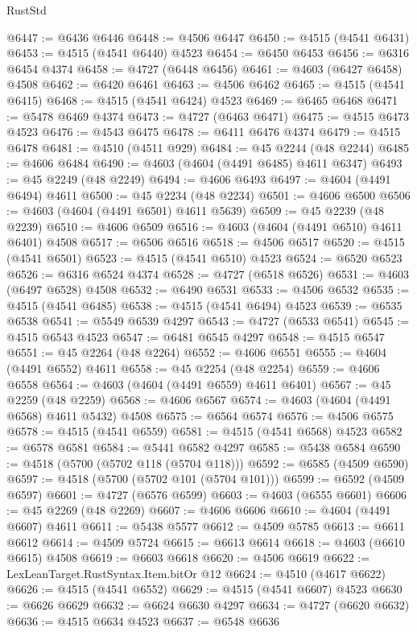 \begin{lexlean}{RustStd}
\begin{coremodule}
@6447 := @6436 @6446
@6448 := @4506 @6447
@6450 := @4515 (@4541 @6431)
@6453 := @4515 (@4541 @6440) @4523
@6454 := @6450 @6453
@6456 := @6316 @6454 @4374
@6458 := @4727 (@6448 @6456)
@6461 := @4603 (@6427 @6458) @4508
@6462 := @6420 @6461
@6463 := @4506 @6462
@6465 := @4515 (@4541 @6415)
@6468 := @4515 (@4541 @6424) @4523
@6469 := @6465 @6468
@6471 := @5478 @6469 @4374
@6473 := @4727 (@6463 @6471)
@6475 := @4515 @6473 @4523
@6476 := @4543 @6475
@6478 := @6411 @6476 @4374
@6479 := @4515 @6478
@6481 := @4510 (@4511 @929)
@6484 := @45 @2244 (@48 @2244)
@6485 := @4606 @6484
@6490 := @4603 (@4604 (@4491 @6485) @4611 @6347)
@6493 := @45 @2249 (@48 @2249)
@6494 := @4606 @6493
@6497 := @4604 (@4491 @6494) @4611
@6500 := @45 @2234 (@48 @2234)
@6501 := @4606 @6500
@6506 := @4603 (@4604 (@4491 @6501) @4611 @5639)
@6509 := @45 @2239 (@48 @2239)
@6510 := @4606 @6509
@6516 := @4603 (@4604 (@4491 @6510) @4611 @6401) @4508
@6517 := @6506 @6516
@6518 := @4506 @6517
@6520 := @4515 (@4541 @6501)
@6523 := @4515 (@4541 @6510) @4523
@6524 := @6520 @6523
@6526 := @6316 @6524 @4374
@6528 := @4727 (@6518 @6526)
@6531 := @4603 (@6497 @6528) @4508
@6532 := @6490 @6531
@6533 := @4506 @6532
@6535 := @4515 (@4541 @6485)
@6538 := @4515 (@4541 @6494) @4523
@6539 := @6535 @6538
@6541 := @5549 @6539 @4297
@6543 := @4727 (@6533 @6541)
@6545 := @4515 @6543 @4523
@6547 := @6481 @6545 @4297
@6548 := @4515 @6547
@6551 := @45 @2264 (@48 @2264)
@6552 := @4606 @6551
@6555 := @4604 (@4491 @6552) @4611
@6558 := @45 @2254 (@48 @2254)
@6559 := @4606 @6558
@6564 := @4603 (@4604 (@4491 @6559) @4611 @6401)
@6567 := @45 @2259 (@48 @2259)
@6568 := @4606 @6567
@6574 := @4603 (@4604 (@4491 @6568) @4611 @5432) @4508
@6575 := @6564 @6574
@6576 := @4506 @6575
@6578 := @4515 (@4541 @6559)
@6581 := @4515 (@4541 @6568) @4523
@6582 := @6578 @6581
@6584 := @5441 @6582 @4297
@6585 := @5438 @6584
@6590 := @4518 (@5700 (@5702 @118 (@5704 @118)))
@6592 := @6585 (@4509 @6590)
@6597 := @4518 (@5700 (@5702 @101 (@5704 @101)))
@6599 := @6592 (@4509 @6597)
@6601 := @4727 (@6576 @6599)
@6603 := @4603 (@6555 @6601)
@6606 := @45 @2269 (@48 @2269)
@6607 := @4606 @6606
@6610 := @4604 (@4491 @6607) @4611
@6611 := @5438 @5577
@6612 := @4509 @5785
@6613 := @6611 @6612
@6614 := @4509 @5724
@6615 := @6613 @6614
@6618 := @4603 (@6610 @6615) @4508
@6619 := @6603 @6618
@6620 := @4506 @6619
@6622 := LexLeanTarget.RustSyntax.Item.bitOr @12
@6624 := @4510 (@4617 @6622)
@6626 := @4515 (@4541 @6552)
@6629 := @4515 (@4541 @6607) @4523
@6630 := @6626 @6629
@6632 := @6624 @6630 @4297
@6634 := @4727 (@6620 @6632)
@6636 := @4515 @6634 @4523
@6637 := @6548 @6636

\end{coremodule}
\end{lexlean}
